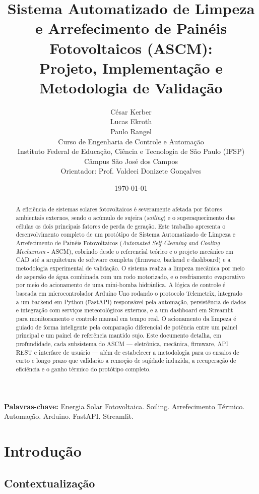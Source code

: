 \documentclass[12pt, a4paper]{article}
\title{
    \vspace{-1.5cm}
    \textbf{Sistema Automatizado de Limpeza e Arrefecimento de Painéis Fotovoltaicos (ASCM):\\
    Projeto, Implementação e Metodologia de Validação}
}
\author{
    César Kerber \\
    Lucas Ekroth \\
    Paulo Rangel \\
    \vspace{0.2cm}
    \small Curso de Engenharia de Controle e Automação \\
    \small Instituto Federal de Educação, Ciência e Tecnologia de São Paulo (IFSP) \\
    \small Câmpus São José dos Campos \\
    \small Orientador: Prof. Valdeci Donizete Gonçalves
}
\date{\today}
\begin{document}
\maketitle

\begin{abstract}
\noindent A eficiência de sistemas solares fotovoltaicos é severamente afetada por fatores ambientais externos, sendo o acúmulo de sujeira (\textit{soiling}) e o superaquecimento das células os dois principais fatores de perda de geração. Este trabalho apresenta o desenvolvimento completo de um protótipo de Sistema Automatizado de Limpeza e Arrefecimento de Painéis Fotovoltaicos (\textit{Automated Self-Cleaning and Cooling Mechanism} - ASCM), cobrindo desde o referencial teórico e o projeto mecânico em CAD até a arquitetura de software completa (firmware, backend e dashboard) e a metodologia experimental de validação. O sistema realiza a limpeza mecânica por meio de aspersão de água combinada com um rodo motorizado, e o resfriamento evaporativo por meio do acionamento de uma mini-bomba hidráulica. A lógica de controle é baseada em microcontrolador Arduino Uno rodando o protocolo Telemetrix, integrado a um backend em Python (FastAPI) responsável pela automação, persistência de dados e integração com serviços meteorológicos externos, e a um dashboard em Streamlit para monitoramento e controle manual em tempo real. O acionamento da limpeza é guiado de forma inteligente pela comparação diferencial de potência entre um painel principal e um painel de referência mantido sujo. Este documento detalha, em profundidade, cada subsistema do ASCM — eletrônica, mecânica, firmware, API REST e interface de usuário — além de estabelecer a metodologia para os ensaios de curto e longo prazo que validarão a remoção de sujidade induzida, a recuperação de eficiência e o ganho térmico do protótipo completo.
\end{abstract}

\textbf{Palavras-chave:} Energia Solar Fotovoltaica. Soiling. Arrefecimento Térmico. Automação. Arduino. FastAPI. Streamlit.

\newpage
\tableofcontents
\newpage

\section{Introdução}

\subsection{Contextualização}
\end{document}
